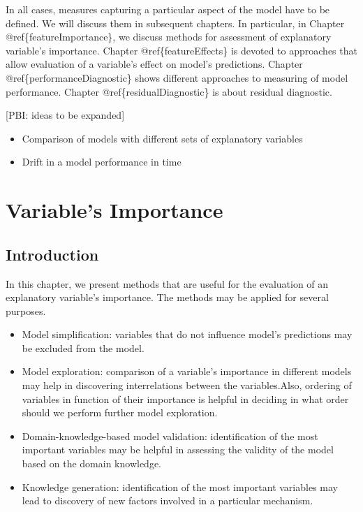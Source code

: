 \documentclass[12pt,]{krantz}
\providecommand{\tightlist}{%
  \setlength{\itemsep}{0pt}\setlength{\parskip}{0pt}}
\begin{document}
In all cases, measures capturing a particular aspect of the model have to be defined. We will discuss them in subsequent chapters. In particular, in Chapter @ref\{featureImportance\}, we discuss methods for assessment of explanatory variable's importance. Chapter @ref\{featureEffects\} is devoted to approaches that allow evaluation of a variable's effect on model's predictions.
Chapter @ref\{performanceDiagnostic\} shows different approaches to measuring of model performance. Chapter @ref\{residualDiagnostic\} is about residual diagnostic.

{[}PBI: ideas to be expanded{]}

\begin{itemize}
\tightlist
\item
  Comparison of models with different sets of explanatory variables
\item
  Drift in a model performance in time
\end{itemize}

\hypertarget{featureImportance}{%
\section{Variable's Importance}\label{featureImportance}}

\hypertarget{featureImportanceIntro}{%
\subsection{Introduction}\label{featureImportanceIntro}}

In this chapter, we present methods that are useful for the evaluation of an explanatory variable's importance. The methods may be applied for several purposes.

\begin{itemize}
\tightlist
\item
  Model simplification: variables that do not influence model's predictions may be excluded from the model.
\item
  Model exploration: comparison of a variable's importance in different models may help in discovering interrelations between the variables.Also, ordering of variables in function of their importance is helpful in deciding in what order should we perform further model exploration.
\item
  Domain-knowledge-based model validation: identification of the most important variables may be helpful in assessing the validity of the model based on the domain knowledge.
\item
  Knowledge generation: identification of the most important variables may lead to discovery of new factors involved in a particular mechanism.
\end{itemize}
\end{document}
